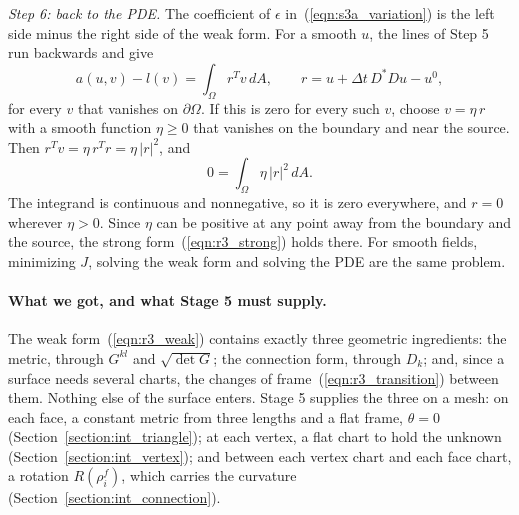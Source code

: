 \emph{Step 6: back to the PDE.} The coefficient of $\epsilon$ in~(\ref{eqn:s3a_variation}) is the left side minus the right side of the weak form. For a smooth $u$, the lines of Step 5 run backwards and give
\begin{equation*}
a(u, v) - l(v) = \int_\Omega r^Tv\, dA, \qquad r = u + \Delta t\, D^*Du - u^0 ,
\end{equation*}
for every $v$ that vanishes on $\partial\Omega$. If this is zero for every such $v$, choose $v = \eta\, r$ with a smooth function $\eta \ge 0$ that vanishes on the boundary and near the source. Then $r^Tv = \eta\, r^Tr = \eta\,|r|^2$, and
\begin{equation*}
0 = \int_\Omega \eta\, |r|^2\, dA .
\end{equation*}
The integrand is continuous and nonnegative, so it is zero everywhere, and $r = 0$ wherever $\eta > 0$. Since $\eta$ can be positive at any point away from the boundary and the source, the strong form~(\ref{eqn:r3_strong}) holds there. For smooth fields, minimizing $J$, solving the weak form and solving the PDE are the same problem.

\paragraph{What we got, and what Stage 5 must supply.} The weak form~(\ref{eqn:r3_weak}) contains exactly three geometric ingredients: the metric, through $G^{kl}$ and $\sqrt{\det G}$; the connection form, through $D_k$; and, since a surface needs several charts, the changes of frame~(\ref{eqn:r3_transition}) between them. Nothing else of the surface enters. Stage 5 supplies the three on a mesh: on each face, a constant metric from three lengths and a flat frame, $\theta = 0$ (Section~\ref{section:int_triangle}); at each vertex, a flat chart to hold the unknown (Section~\ref{section:int_vertex}); and between each vertex chart and each face chart, a rotation $R(\rho_i^f)$, which carries the curvature (Section~\ref{section:int_connection}).

